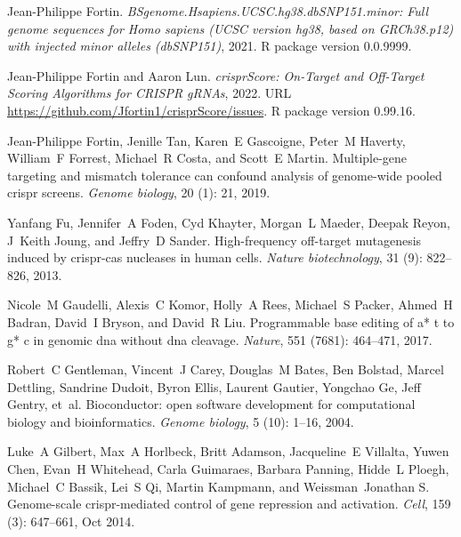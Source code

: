 \documentclass[pdftex,english,10pt]{article}
\begin{document}
{\begin{thebibliography}{105}
Jean-Philippe Fortin.
\newblock \emph{BSgenome.Hsapiens.UCSC.hg38.dbSNP151.minor: Full genome
  sequences for Homo sapiens (UCSC version hg38, based on GRCh38.p12) with
  injected minor alleles (dbSNP151)}, 2021{}.
\newblock R package version 0.0.9999.

Jean-Philippe Fortin and Aaron Lun.
\newblock \emph{crisprScore: On-Target and Off-Target Scoring Algorithms for
  CRISPR gRNAs}, 2022.
\newblock URL \url{https://github.com/Jfortin1/crisprScore/issues}.
\newblock R package version 0.99.16.

Jean-Philippe Fortin, Jenille Tan, Karen~E Gascoigne, Peter~M Haverty,
  William~F Forrest, Michael~R Costa, and Scott~E Martin.
\newblock Multiple-gene targeting and mismatch tolerance can confound analysis
  of genome-wide pooled crispr screens.
\newblock \emph{Genome biology}, 20 (1): 21, 2019.

Yanfang Fu, Jennifer~A Foden, Cyd Khayter, Morgan~L Maeder, Deepak Reyon,
  J~Keith Joung, and Jeffry~D Sander.
\newblock High-frequency off-target mutagenesis induced by crispr-cas nucleases
  in human cells.
\newblock \emph{Nature biotechnology}, 31 (9): 822--826,
  2013.

Nicole~M Gaudelli, Alexis~C Komor, Holly~A Rees, Michael~S Packer, Ahmed~H
  Badran, David~I Bryson, and David~R Liu.
\newblock Programmable base editing of a* t to g* c in genomic dna without dna
  cleavage.
\newblock \emph{Nature}, 551 (7681): 464--471, 2017.

Robert~C Gentleman, Vincent~J Carey, Douglas~M Bates, Ben Bolstad, Marcel
  Dettling, Sandrine Dudoit, Byron Ellis, Laurent Gautier, Yongchao Ge, Jeff
  Gentry, et~al.
\newblock Bioconductor: open software development for computational biology and
  bioinformatics.
\newblock \emph{Genome biology}, 5 (10): 1--16, 2004.

Luke~A Gilbert, Max~A Horlbeck, Britt Adamson, Jacqueline~E Villalta, Yuwen
  Chen, Evan~H Whitehead, Carla Guimaraes, Barbara Panning, Hidde~L Ploegh,
  Michael~C Bassik, Lei~S Qi, Martin Kampmann, and Weissman~Jonathan S.
\newblock Genome-scale crispr-mediated control of gene repression and
  activation.
\newblock \emph{Cell}, 159 (3): 647--661, Oct 2014.


\end{thebibliography}}
\end{document}
